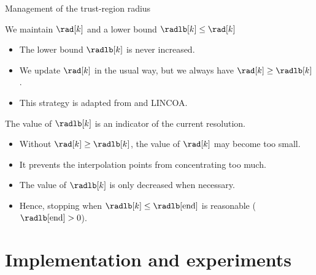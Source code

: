 \documentclass[optimization]{common/talk}
\begin{document}
\begin{frame}{Management of the trust-region radius}
    \begin{block}{We maintain $\rad[k]$ and a lower bound $\radlb[k] \le \rad[k]$}
        \begin{itemize}
            \item The lower bound $\radlb[k]$ is \alert{never} increased.
            \item We update $\rad[k]$ in the usual way, but we \alert{always} have $\rad[k] \ge \radlb[k]$.
            \item This strategy is adapted from \textcite{Powell_2006,Powell_2009} and LINCOA.
        \end{itemize}
    \end{block}

    The value of $\radlb[k]$ is an indicator of the current \alert{resolution}.

    \begin{itemize}
        \item Without $\rad[k] \ge \radlb[k]$, the value of $\rad[k]$ may become too small.
        \item It prevents the interpolation points from \alert{concentrating} too much.
        \item The value of $\radlb[k]$ is only \alert{decreased} when necessary.
        \item Hence, stopping when $\radlb[k] \le \radlb[\textrm{end}]$ is \alert{reasonable} ($\radlb[\textrm{end}] > 0$).
    \end{itemize}
\end{frame}

\section{Implementation and experiments}
\end{document}
